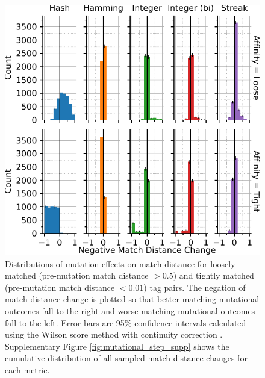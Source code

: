\begin{figure}
\begin{center}

\includegraphics[width=\columnwidth]{img/mutational_step/bitweight=0dot5+seed=1+title=low-mutational-step+viz=hist+_data_hathash_hash=95a57768de56995a+_script_fullcat_hash=a93d0f4f3ed86028+ext=}
\caption{
Distributions of mutation effects on match distance for loosely matched (pre-mutation match distance $> 0.5$) and tightly matched (pre-mutation match distance $< 0.01$) tag pairs.
The negation of match distance change is plotted so that better-matching mutational outcomes fall to the right and worse-matching mutational outcomes fall to the left.
Error bars are 95\% confidence intervals calculated using the Wilson score method with continuity correction \citep{newcombe1998two}.
Supplementary Figure \ref{fig:mutational_step_supp} shows the cumulative distribution of all sampled match distance changes for each metric.
}
\label{fig:mutational_step}

\end{center}
\end{figure}
